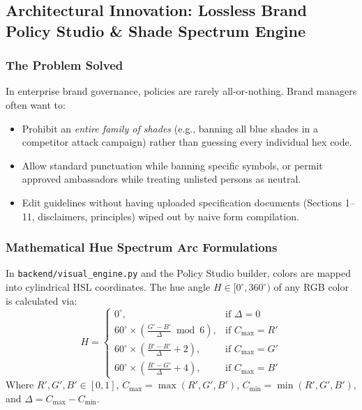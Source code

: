 \documentclass[11pt,a4paper]{article}
\begin{document}
\subsection{Architectural Innovation: Lossless Brand Policy Studio \& Shade Spectrum Engine}

\subsubsection{The Problem Solved}
In enterprise brand governance, policies are rarely all-or-nothing. Brand managers often want to:
\begin{itemize}[leftmargin=1cm]
    \item Prohibit an \textit{entire family of shades} (e.g., banning all blue shades in a competitor attack campaign) rather than guessing every individual hex code.
    \item Allow standard punctuation while banning specific symbols, or permit approved ambassadors while treating unlisted persons as neutral.
    \item Edit guidelines without having uploaded specification documents (Sections 1--11, disclaimers, principles) wiped out by naive form compilation.
\end{itemize}

\subsubsection{Mathematical Hue Spectrum Arc Formulations}
In \texttt{backend/visual\_engine.py} and the Policy Studio builder, colors are mapped into cylindrical HSL coordinates. The hue angle $H \in [0^\circ, 360^\circ)$ of any RGB color is calculated via:
\begin{equation}
    H = \begin{cases}
        0^\circ, & \text{if } \Delta = 0 \\
        60^\circ \times \left(\frac{G' - B'}{\Delta} \bmod 6\right), & \text{if } C_{\max} = R' \\
        60^\circ \times \left(\frac{B' - R'}{\Delta} + 2\right), & \text{if } C_{\max} = G' \\
        60^\circ \times \left(\frac{R' - G'}{\Delta} + 4\right), & \text{if } C_{\max} = B'
    \end{cases}
\end{equation}
Where $R', G', B' \in [0, 1]$, $C_{\max} = \max(R', G', B')$, $C_{\min} = \min(R', G', B')$, and $\Delta = C_{\max} - C_{\min}$.
\end{document}
